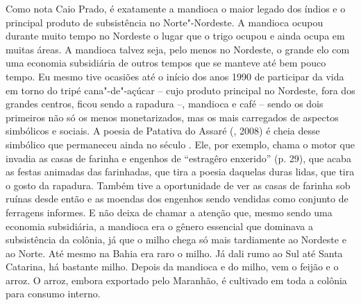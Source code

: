 {Como nota Caio Prado, é exatamente a mandioca o maior legado dos índios
e o principal produto de subsistência no Norte"-Nordeste. A mandioca
ocupou durante muito tempo no Nordeste o lugar que o trigo ocupou e
ainda ocupa em muitas áreas. A mandioca talvez seja, pelo menos no
Nordeste, o grande elo com uma economia subsidiária de outros tempos que
se manteve até bem pouco tempo. Eu mesmo tive ocasiões até o início dos
anos 1990 de participar da vida em torno do tripé cana"-de"-açúcar -- cujo
produto principal no Nordeste, fora dos grandes centros, ficou sendo a
rapadura --, mandioca e café -- sendo os dois primeiros não só os menos
monetarizados, mas os mais carregados de aspectos simbólicos e sociais.
A poesia de Patativa do Assaré (, 2008) é cheia desse simbólico
que permaneceu ainda no século . Ele, por exemplo, chama o motor que
invadia as casas de farinha e engenhos de ``estragêro enxerido'' (p.
29), que acaba as festas animadas das farinhadas, que tira a poesia
daquelas duras lidas, que tira o gosto da rapadura. Também tive a
oportunidade de ver as casas de farinha sob ruínas desde então e as
moendas dos engenhos sendo vendidas como conjunto de ferragens informes.
E não deixa de chamar a atenção que, mesmo sendo uma economia
subsidiária, a mandioca era o gênero essencial que dominava a
subsistência da colônia, já que o milho chega só mais tardiamente ao
Nordeste e ao Norte. Até mesmo na Bahia era raro o milho. Já dali rumo
ao Sul até Santa Catarina, há bastante milho. Depois da mandioca e do
milho, vem o feijão e o arroz. O arroz, embora exportado pelo Maranhão,
é cultivado em toda a colônia para consumo interno.

}
